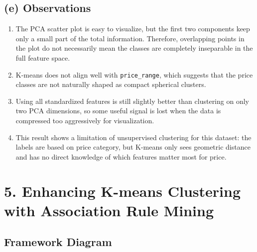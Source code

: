 \documentclass[11pt, a4paper]{article}
\begin{document}
\subsection*{(e) Observations}
\begin{enumerate}
    \item The PCA scatter plot is easy to visualize, but the first two components keep only a small part of the total information. Therefore, overlapping points in the plot do not necessarily mean the classes are completely inseparable in the full feature space.
    \item K-means does not align well with \texttt{price\_range}, which suggests that the price classes are not naturally shaped as compact spherical clusters.
    \item Using all standardized features is still slightly better than clustering on only two PCA dimensions, so some useful signal is lost when the data is compressed too aggressively for visualization.
    \item This result shows a limitation of unsupervised clustering for this dataset: the labels are based on price category, but K-means only sees geometric distance and has no direct knowledge of which features matter most for price.
\end{enumerate}

\section*{5. Enhancing K-means Clustering with Association Rule Mining}

\subsection*{Framework Diagram}
\end{document}
